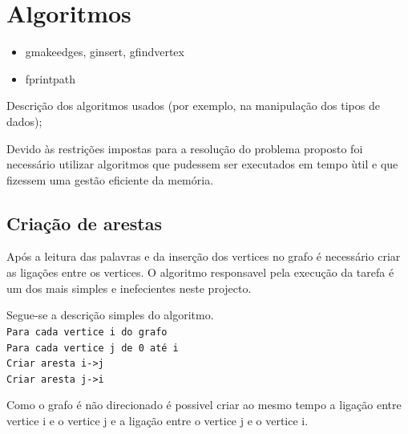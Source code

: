 \documentclass[a4paper, 18pt]{article}
\newcommand\tu[0]{\textunderscore}
\begin{document}
\section{Algoritmos}
\begin{itemize}
		\item g\tu make\tu edges, g\tu insert, g\tu find\tu vertex
		\item fprint\tu path
	\end{itemize}
	\par
	Descrição dos algoritmos usados (por exemplo, na manipulação dos tipos de 
dados);

	\par
	Devido às restrições impostas para a resolução do problema proposto foi 
necessário utilizar algoritmos que pudessem ser executados em tempo ùtil e que 
fizessem uma gestão eficiente da memória.


\subsection{Criação de arestas}
	\par
	Após a leitura das palavras e da inserção dos vertices no grafo é 
necessário criar as ligações entre os vertices. O algoritmo responsavel pela 
execução da tarefa é um dos mais simples e inefecientes neste projecto.
	\par
	Segue-se a descrição simples do algoritmo.\\
	
	
	\texttt{Para cada vertice i do grafo}\\
	\indent\indent\texttt{Para cada vertice j de 0 até i}\\
	\indent\indent\indent\texttt{Criar aresta i->j}\\
	\indent\indent\indent\texttt{Criar aresta j->i}\\
	
	\par
	Como o grafo é não direcionado é possivel criar ao mesmo tempo a ligação 
entre vertice i e o vertice j e a ligação entre o vertice j e o vertice i.
	
	
\end{document}

